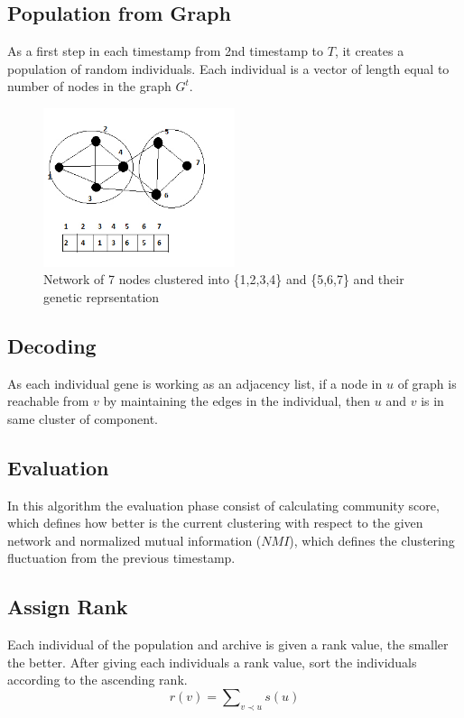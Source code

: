 \documentclass[12pt]{arsubmit}
\begin{document}
\subsection {Population from Graph}
As a first step in each timestamp from 2nd timestamp to $T$, it creates a population of random individuals. Each individual is a vector of length equal to number of nodes in the graph $G^t$. 
\begin{figure}
\centering
\includegraphics[width=0.5\textwidth]{graph}
\caption {Network of 7 nodes clustered into \{1,2,3,4\} and \{5,6,7\} and their genetic reprsentation}
\label {fig:graph}
\end{figure}
\subsection {Decoding}
As each individual gene is working as an adjacency list, if a node in $u$ of graph is reachable from $v$ by maintaining the edges in the individual, then $u$ and $v$ is in same cluster of component.
\subsection {Evaluation}
In this algorithm the evaluation phase consist of calculating community score, which defines how better is the current clustering with respect to the given network and normalized mutual information ($NMI$), which defines the clustering fluctuation from the previous timestamp. 
\subsection {Assign Rank}
Each individual of the population and archive is given a rank value, the smaller the better. After giving each individuals a rank value, sort the individuals according to the ascending rank. 
\begin {equation}
r(v) = \sum\nolimits_{v\prec u} s(u)
\label {eq:rank}
\end {equation}
\end{document}
